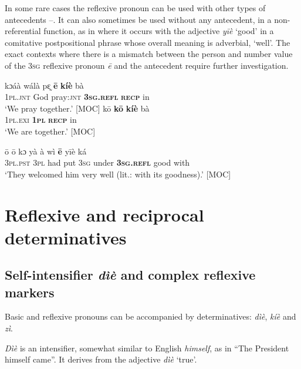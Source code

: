 \documentclass[output=paper]{langscibook}
\begin{document}
In some rare cases the reflexive pronoun can be used with other types of antecedents --. It can also sometimes be used without any antecedent, in a non-referential function, as in  where it occurs with the adjective \textit{yīè} ‘good’ in a comitative postpositional phrase whose overall meaning is adverbial, ‘well’. The exact contexts where there is a mismatch between the person and number value of the 3\textsc{sg} reflexive pronoun \textit{ē} and the antecedent require further investigation.


 
\ea
\label{ex:Kachaturyan:7}
    \ea
    \label{ex:Kachaturyan:7a} 
\gll kɔáà  wálà   pɛ̰  \textbf{ē}  \textbf{kíè}  bà \\
     \textsc{1pl.jnt}  God  pray\textsc{:jnt}  \textbf{\textsc{3sg.refl}}  \textbf{\textsc{recp}  }in \\
\glt ‘We pray together.’ [MOC] 
\ex
    \label{ex:Kachaturyan:7b} 
\gll kō  \textbf{kō}  \textbf{kíè}  bà\\
     1\textsc{pl.exi}  \textbf{\textsc{1pl}}  \textbf{\textsc{recp}}  in\\
\glt ‘We are together.’ [MOC]
\z
\z

\ea
    \label{ex:Kachaturyan:8} 
 \gll ō  ō  kɔ  yà  à  wì  \textbf{ē}  yīè  ká\\
     3\textsc{pl.pst}  \textsc{3pl}  had  put  \textsc{3sg}  under    \textbf{3\textsc{sg.refl}}  good  with\\
\glt ‘They welcomed him very well (lit.: with its goodness).’ [MOC]
\z


 \section{Reflexive and reciprocal determinatives}\label{sec:Kachaturyan:4}


 \subsection{Self-intensifier \textit{dìè} and complex reflexive markers}\label{sec:Kachaturyan:4.1}

Basic and reflexive pronouns can be accompanied by determinatives: \textit{dìè}, \textit{kíè} and \textit{zì}.

\textit{Dìè} is an intensifier, somewhat similar to English \textit{himself}, as in “The President himself came”. It derives from the adjective \textit{dìè} ‘true’.
\end{document}
